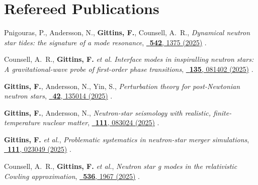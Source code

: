 
\section{Refereed Publications}
\secstartswithlist{}%
\addtocounter{pubCounter}{-1}%
\begin{etaremune}[start=\value{pubCounter}]
\item
  Pnigouras, P., Andersson, N., \textbf{Gittins, F.}, Counsell, A.~R.,
  \textit{Dynamical neutron star tides: the signature of a mode resonance},
  \href{https://doi.org/10.1093/mnras/staf1285}%
  {\mnras\ \textbf{542}, 1375 (2025)}
  .
\item
  Counsell, A.~R., \textbf{Gittins, F.} \textit{et al.}
  \textit{Interface modes in inspiralling neutron stars: A gravitational-wave
  probe of first-order phase transitions},
  \href{https://doi.org/10.1103/8hvq-6dy7}%
  {\prl\ \textbf{135}, 081402 (2025)}
  .
\item
  \textbf{Gittins, F.}, Andersson, N., Yin, S.,
  \textit{Perturbation theory for post-Newtonian neutron stars},
  \href{https://doi.org/10.1088/1361-6382/ade83f}%
  {\cqg\ \textbf{42}, 135014 (2025)}
  .
\item
  \textbf{Gittins, F.}, Andersson, N.,
  \textit{Neutron-star seismology with realistic, finite-temperature nuclear
  matter},
  \href{https://doi.org/10.1103/PhysRevD.111.083024}%
  {\prd\ \textbf{111}, 083024 (2025)}
  .
\item
  \textbf{Gittins, F.} \textit{et al.},
  \textit{Problematic systematics in neutron-star merger simulations},
  \href{https://doi.org/10.1103/PhysRevD.111.023049}%
  {\prd\ \textbf{111}, 023049 (2025)}
  .
\item
  Counsell, A.~R., \textbf{Gittins, F.} \textit{et al.},
  \textit{Neutron star g modes in the relativistic Cowling approximation},
  \href{https://doi.org/10.1093/mnras/stae2721}%
  {\mnras\ \textbf{536}, 1967 (2025)}
  .
\item

\end{etaremune}
